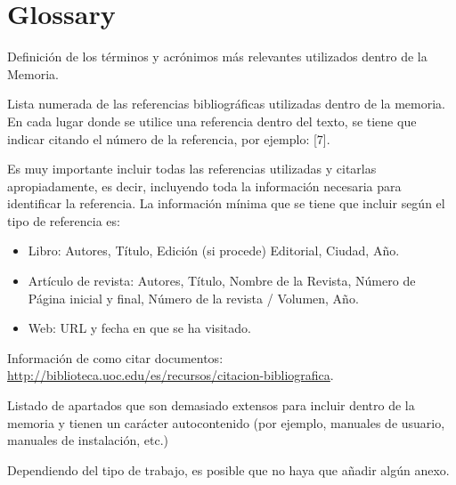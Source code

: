 \documentclass[ENG, BIB]{TFUOC}%
\begin{document}


\chapter{Glossary}

Definición de los \cite{ulaszewskaNutrimetabolomicsIntegrativeAction2019a} términos y acrónimos más relevantes utilizados dentro de la Memoria.


\printbibliography[heading=bibintoc]

Lista numerada de las referencias bibliográficas utilizadas dentro de la memoria. En cada lugar donde se utilice una referencia dentro del texto, se tiene que indicar citando el número de la referencia, por ejemplo: [7].

Es muy importante incluir todas las referencias utilizadas y citarlas apropiadamente, es decir, incluyendo toda la información necesaria para identificar la referencia. La información mínima que se tiene que incluir según el tipo de referencia es:

\begin{itemize}
\item Libro: Autores, Título, Edición (si procede) Editorial, Ciudad, Año.
\item  Artículo de revista: Autores, Título, Nombre de la Revista, Número de Página inicial y final, Número de la revista / Volumen, Año.
\item  Web: URL y fecha en que se ha visitado.
\end{itemize}

Información de como citar documentos: \url{http://biblioteca.uoc.edu/es/recursos/citacion-bibliografica}.


\newpage
\appendix
Listado de apartados que son demasiado extensos para incluir dentro de la memoria y tienen un carácter autocontenido (por ejemplo, manuales de usuario, manuales de instalación, etc.)
 
Dependiendo del tipo de trabajo, es posible que no haya que añadir algún anexo.
\end{document}
